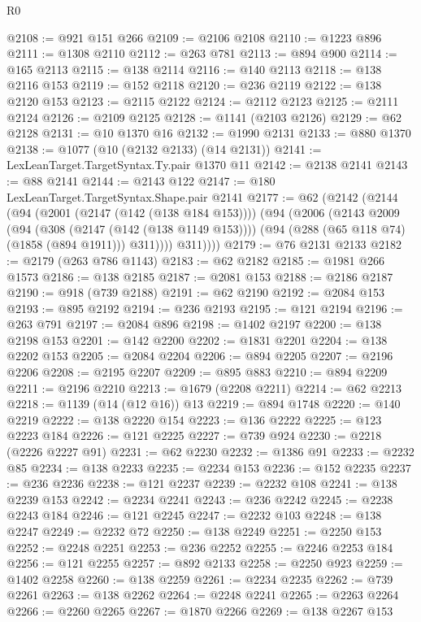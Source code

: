 \begin{lexlean}{R0}
\begin{coremodule}
@2108 := @921 @151 @266
@2109 := @2106 @2108
@2110 := @1223 @896
@2111 := @1308 @2110
@2112 := @263 @781
@2113 := @894 @900
@2114 := @165 @2113
@2115 := @138 @2114
@2116 := @140 @2113
@2118 := @138 @2116 @153
@2119 := @152 @2118
@2120 := @236 @2119
@2122 := @138 @2120 @153
@2123 := @2115 @2122
@2124 := @2112 @2123
@2125 := @2111 @2124
@2126 := @2109 @2125
@2128 := @1141 (@2103 @2126)
@2129 := @62 @2128
@2131 := @10 @1370 @16
@2132 := @1990 @2131
@2133 := @880 @1370
@2138 := @1077 (@10 (@2132 @2133) (@14 @2131))
@2141 := LexLeanTarget.TargetSyntax.Ty.pair @1370 @11
@2142 := @2138 @2141
@2143 := @88 @2141
@2144 := @2143 @122
@2147 := @180 LexLeanTarget.TargetSyntax.Shape.pair @2141
@2177 := @62
    (@2142
      (@2144
        (@94
          (@2001 (@2147 (@142 (@138 @184 @153))))
          (@94
            (@2006
              (@2143
                @2009
                (@94
                  (@308 (@2147 (@142 (@138 @1149 @153))))
                  (@94 (@288 (@65 @118 @74) (@1858 (@894 @1911))) @311))))
            @311))))
@2179 := @76 @2131 @2133
@2182 := @2179 (@263 @786 @1143)
@2183 := @62 @2182
@2185 := @1981 @266 @1573
@2186 := @138 @2185
@2187 := @2081 @153
@2188 := @2186 @2187
@2190 := @918 (@739 @2188)
@2191 := @62 @2190
@2192 := @2084 @153
@2193 := @895 @2192
@2194 := @236 @2193
@2195 := @121 @2194
@2196 := @263 @791
@2197 := @2084 @896
@2198 := @1402 @2197
@2200 := @138 @2198 @153
@2201 := @142 @2200
@2202 := @1831 @2201
@2204 := @138 @2202 @153
@2205 := @2084 @2204
@2206 := @894 @2205
@2207 := @2196 @2206
@2208 := @2195 @2207
@2209 := @895 @883
@2210 := @894 @2209
@2211 := @2196 @2210
@2213 := @1679 (@2208 @2211)
@2214 := @62 @2213
@2218 := @1139 (@14 (@12 @16)) @13
@2219 := @894 @1748
@2220 := @140 @2219
@2222 := @138 @2220 @154
@2223 := @136 @2222
@2225 := @123 @2223 @184
@2226 := @121 @2225
@2227 := @739 @924
@2230 := @2218 (@2226 @2227 @91)
@2231 := @62 @2230
@2232 := @1386 @91
@2233 := @2232 @85
@2234 := @138 @2233
@2235 := @2234 @153
@2236 := @152 @2235
@2237 := @236 @2236
@2238 := @121 @2237
@2239 := @2232 @108
@2241 := @138 @2239 @153
@2242 := @2234 @2241
@2243 := @236 @2242
@2245 := @2238 @2243 @184
@2246 := @121 @2245
@2247 := @2232 @103
@2248 := @138 @2247
@2249 := @2232 @72
@2250 := @138 @2249
@2251 := @2250 @153
@2252 := @2248 @2251
@2253 := @236 @2252
@2255 := @2246 @2253 @184
@2256 := @121 @2255
@2257 := @892 @2133
@2258 := @2250 @923
@2259 := @1402 @2258
@2260 := @138 @2259
@2261 := @2234 @2235
@2262 := @739 @2261
@2263 := @138 @2262
@2264 := @2248 @2241
@2265 := @2263 @2264
@2266 := @2260 @2265
@2267 := @1870 @2266
@2269 := @138 @2267 @153

\end{coremodule}
\end{lexlean}
